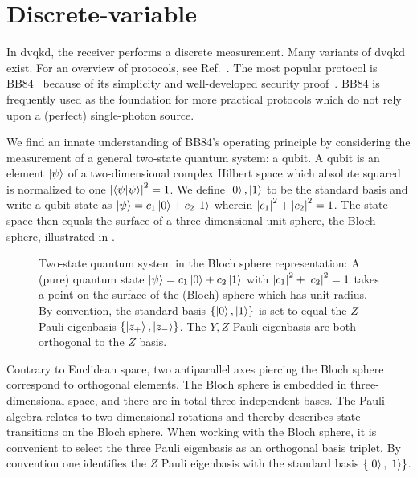 \section{Discrete-variable}


In \gls{dvqkd}, the receiver performs a discrete measurement.
Many variants of \gls{dvqkd} exist. For an overview of protocols, see Ref.~\cite{Duvsek2006}.
The most popular protocol is BB84~\cite{Bennett1984} because of its simplicity and well-developed security proof~\cite{Shor2000}.
BB84 is frequently used as the foundation for more practical protocols which do not rely upon a (perfect) single-photon source.

We find an innate understanding of BB84's operating principle by considering the measurement of a general two-state quantum system: a qubit.
A qubit is an element $\ket{\psi}$ of a two-dimensional complex Hilbert space which absolute squared is normalized to one $\abs{\braket{\psi}}^2=1$.
We define $\ket{0},\ket{1}$ to be the standard basis and write a qubit state as $\ket{\psi}=c_1\ket{0}+c_2\ket{1}$ wherein $\abs{c_1}^2+\abs{c_2}^2=1$.
The state space then equals the surface of a three-dimensional unit sphere, the Bloch sphere, illustrated in .
\begin{figure}[htb]
	\centering
	
	\caption{Two-state quantum system in the Bloch sphere representation: A (pure) quantum state  $\ket{\psi}=c_1\ket{0}+c_2\ket{1}$ with $\abs{c_1}^2+\abs{c_2}^2=1$ takes a point on the surface of the (Bloch) sphere which has unit radius. By convention, the standard basis $\left\{\ket{0},\ket{1}\right\}$ is set to equal the $Z$ Pauli eigenbasis $\left\{\ket{z_+},\ket{z_-}\right\}$. The $Y,Z$ Pauli eigenbasis are both orthogonal to the $Z$ basis.}\label{fig:bloch_sphere}
\end{figure}
Contrary to Euclidean space, two antiparallel axes piercing the Bloch sphere correspond to orthogonal elements.
The Bloch sphere is embedded in three-dimensional space, and there are in total three independent bases.
The Pauli algebra relates to two-dimensional rotations and thereby describes state transitions on the Bloch sphere.
When working with the Bloch sphere, it is convenient to select the three Pauli eigenbasis as an orthogonal basis triplet.
By convention one identifies the $Z$ Pauli eigenbasis with the standard basis $\left\{\ket{0},\ket{1}\right\}$.

